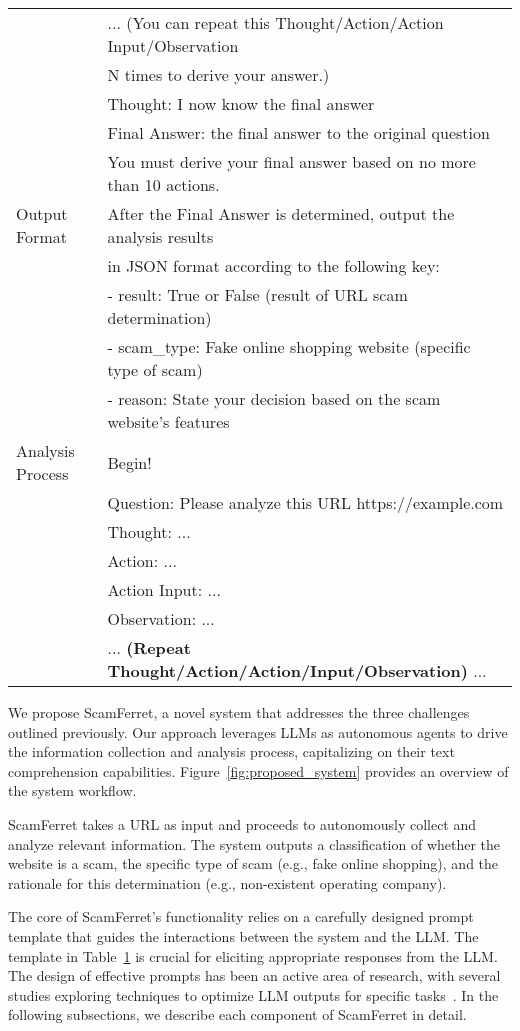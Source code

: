 \documentclass[runningheads]{llncs}
\begin{document}
\begin{table}[!t]
{\begin{tabular}{ll}
 & ... (You can repeat this Thought/Action/Action Input/Observation \\
 & N times to derive your answer.) \\
 & Thought: I now know the final answer \\
 & Final Answer: the final answer to the original question \\
 & You must derive your final answer based on no more than 10 actions. \\ \midrule
Output Format & After the Final Answer is determined, output the analysis results \\
 & in JSON format according to the following key: \\
 & - result: True or False (result of URL scam determination) \\
 & - scam\_type: Fake online shopping website (specific type of scam) \\
 & - reason: State your decision based on the scam website's features \\ \midrule
Analysis Process & Begin! \\
 & Question: Please analyze this URL https://example.com \\
 & Thought: ...  \\ 
 & Action: ... \\
 & Action Input: ... \\
 & Observation: ... \\
 & ...\textbf{ (Repeat Thought/Action/Action/Input/Observation) }... \\
\bottomrule
\end{tabular}
}
\label{tab:prompt}
\end{table}

We propose ScamFerret, a novel system that addresses the three challenges outlined previously.
Our approach leverages LLMs as autonomous agents to drive the information collection and analysis process, capitalizing on their text comprehension capabilities.
Figure~\ref{fig:proposed_system} provides an overview of the system workflow.

ScamFerret takes a URL as input and proceeds to autonomously collect and analyze relevant information.
The system outputs a classification of whether the website is a scam, the specific type of scam (e.g., fake online shopping), and the rationale for this determination (e.g., non-existent operating company).

The core of ScamFerret's functionality relies on a carefully designed prompt template that guides the interactions between the system and the LLM.
The template in Table~\ref{tab:prompt} is crucial for eliciting appropriate responses from the LLM.
The design of effective prompts has been an active area of research, with several studies exploring techniques to optimize LLM outputs for specific tasks~\cite{DBLP:conf/iclr/ZhouMHPPCB23,DBLP:journals/corr/abs-2302-11382}.
In the following subsections, we describe each component of ScamFerret in detail.
\end{document}
